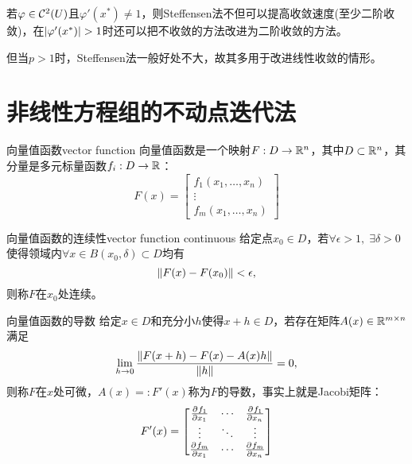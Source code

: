 \begin{remark}
    若$\varphi\in\mathcal C^2(U)$且$\varphi'(x^*)\neq 1$，则Steffensen法不但可以提高收敛速度(至少二阶收敛)，在$\left\lvert\varphi'(x^*)\right\rvert>1$时还可以把不收敛的方法改进为二阶收敛的方法。

    但当$p>1$时，Steffensen法一般好处不大，故其多用于改进线性收敛的情形。
\end{remark}

\section{非线性方程组的不动点迭代法}

\begin{definition}
    {向量值函数}{vector function}
    向量值函数是一个映射$F:D\to\mathbb R^n$，其中$D\subset\mathbb R^n$，其分量是多元标量函数$f_i:D\to\mathbb R$：
    \begin{equation}
        F(x)=\begin{bmatrix}
            f_1(x_1,\ldots,x_n)\\\vdots\\f_m(x_1,\ldots,x_n)
        \end{bmatrix}
    \end{equation}
\end{definition}

\begin{definition}
    {向量值函数的连续性}{vector function continuous}
    给定点$x_0\in D$，若$\forall\epsilon>1,\;\exists\delta>0$使得领域内$\forall x\in B(x_0,\delta)\subset D$均有
    \[
        \left\lVert F(x)-F(x_0)\right\rVert<\epsilon,
    \]
    则称$F$在$x_0$处连续。
\end{definition}

\begin{definition}
    {向量值函数的导数}{}
    给定$x\in D$和充分小$h$使得$x+h\in D$，若存在矩阵$A(x)\in\mathbb R^{m\times n}$满足 
    \begin{equation}
        \lim_{h\to 0}\frac{\left\lVert F(x+h)-F(x)-A(x)h\right\rVert}{\left\lVert h\right\rVert}=0,
    \end{equation}
    则称$F$在$x$处可微，$A(x)=:F'(x)$称为$F$的导数，事实上就是Jacobi矩阵：
    \begin{equation}
        F'(x)=\begin{bmatrix}
            \frac{\partial^{{}}f_1}{\partial{x_1}^{{}}}&\cdots&\frac{\partial^{{}}f_1}{\partial{x_n}^{{}}}\\
            \vdots&\ddots&\vdots\\
            \frac{\partial^{{}}f_m}{\partial{x_1}^{{}}}&\cdots&\frac{\partial^{{}}f_m}{\partial{x_n}^{{}}}
        \end{bmatrix}
    \end{equation}
\end{definition}

